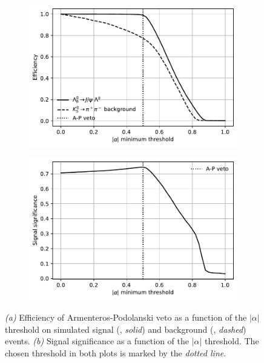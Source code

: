 \begin{figure}[t]
	\centering
	\begin{subfigure}{.45\textwidth}
		\includegraphics[height=.2\textheight]{graphics/04-event_selection/ap_efficiencies.pdf}
		\caption{}
		\label{fig:4:ap_efficiency}
	\end{subfigure}
	\begin{subfigure}{.45\textwidth}
		\includegraphics[height=.2\textheight]{graphics/04-event_selection/ap_significances.pdf}
		\caption{}
		\label{fig:4:ap_significance}
	\end{subfigure}
	\caption{\textit{(a)} Efficiency of Armenteros-Podolanski veto as a function of the $|\alpha|$ threshold on simulated signal (\demonstratorshort, \textit{solid}) and background (\physbkgshort, \textit{dashed}) events. \textit{(b)} Signal significance as a function of the $|\alpha|$ threshold. The chosen threshold in both plots is marked by the \textit{dotted line}.}
	\label{fig:4:ap_threshold_optimization}
\end{figure}

